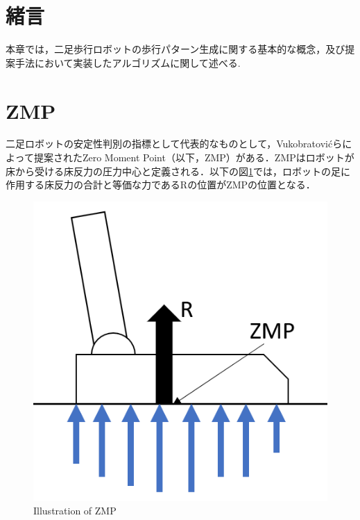 \section{緒言}
本章では，二足歩行ロボットの歩行パターン生成に関する基本的な概念，及び提案手法において実装したアルゴリズムに関して述べる.


\section{ZMP}
二足ロボットの安定性判別の指標として代表的なものとして，Vukobratovićらによって提案されたZero Moment Point（以下，ZMP）\cite{VUKOBRATOVIC19721}がある．ZMPはロボットが床から受ける床反力の圧力中心と定義される．以下の図\ref{Fig:zmpillust}では，ロボットの足に作用する床反力の合計と等価な力であるRの位置がZMPの位置となる．

\begin{figure}[hbtp]
  \centering
  \includegraphics[keepaspectratio, scale=0.6]
  {images/zmp_ilust.png}
  \caption{Illustration of ZMP }
  \label{Fig:zmpillust}
\end{figure}
\newpage

